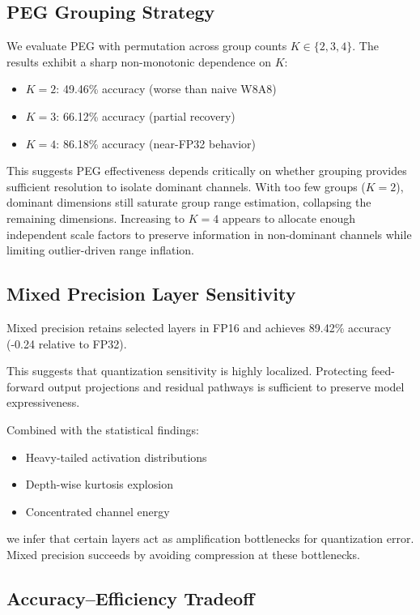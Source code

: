 \documentclass[conference]{IEEEtran}
\begin{document}
\subsection{PEG Grouping Strategy}

We evaluate PEG with permutation across group counts $K \in \{2,3,4\}$. The results exhibit a sharp non-monotonic dependence on $K$:

\begin{itemize}
\item $K=2$: 49.46\% accuracy (worse than naive W8A8)
\item $K=3$: 66.12\% accuracy (partial recovery)
\item $K=4$: 86.18\% accuracy (near-FP32 behavior)
\end{itemize}

This suggests PEG effectiveness depends critically on whether grouping provides sufficient resolution to isolate dominant channels. With too few groups ($K=2$), dominant dimensions still saturate group range estimation, collapsing the remaining dimensions. Increasing to $K=4$ appears to allocate enough independent scale factors to preserve information in non-dominant channels while limiting outlier-driven range inflation.

\subsection{Mixed Precision Layer Sensitivity}

Mixed precision retains selected layers in FP16 and achieves 89.42\% accuracy (-0.24 relative to FP32).

This suggests that quantization sensitivity is highly localized. Protecting feed-forward output projections and residual pathways is sufficient to preserve model expressiveness.

Combined with the statistical findings:

\begin{itemize}
\item Heavy-tailed activation distributions
\item Depth-wise kurtosis explosion
\item Concentrated channel energy
\end{itemize}

we infer that certain layers act as amplification bottlenecks for quantization error. Mixed precision succeeds by avoiding compression at these bottlenecks.

\subsection{Accuracy–Efficiency Tradeoff}
\end{document}
